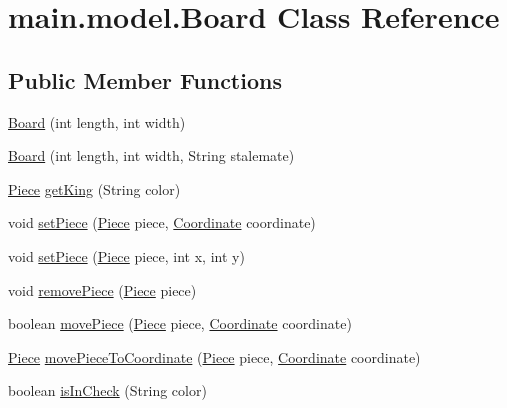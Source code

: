 \hypertarget{classmain_1_1model_1_1_board}{}\section{main.\+model.\+Board Class Reference}
\label{classmain_1_1model_1_1_board}
\subsection*{Public Member Functions}
\begin{DoxyCompactItemize}
\item 
\hyperlink{classmain_1_1model_1_1_board_aa960cea7bc44db0fdb54d18767579c52}{Board} (int length, int width)
\item 
\hyperlink{classmain_1_1model_1_1_board_a96612d9907fdc7144072b39701f3c98f}{Board} (int length, int width, String stalemate)
\item 
\hyperlink{classmain_1_1pieces_1_1_piece}{Piece} \hyperlink{classmain_1_1model_1_1_board_a58b12960567f10637634a020d9bc7ed6}{get\+King} (String color)
\item 
void \hyperlink{classmain_1_1model_1_1_board_ac89ac2b16c2e7ed3e0ff9160b471d99c}{set\+Piece} (\hyperlink{classmain_1_1pieces_1_1_piece}{Piece} piece, \hyperlink{classmain_1_1model_1_1_coordinate}{Coordinate} coordinate)
\item 
void \hyperlink{classmain_1_1model_1_1_board_a410cd03e774ce09fce169f8b047e413a}{set\+Piece} (\hyperlink{classmain_1_1pieces_1_1_piece}{Piece} piece, int x, int y)
\item 
void \hyperlink{classmain_1_1model_1_1_board_a267a2fd3d08cb25c4d35ceb9c61e5402}{remove\+Piece} (\hyperlink{classmain_1_1pieces_1_1_piece}{Piece} piece)
\item 
boolean \hyperlink{classmain_1_1model_1_1_board_a8924f9087f10a4554958ac48480e9b0b}{move\+Piece} (\hyperlink{classmain_1_1pieces_1_1_piece}{Piece} piece, \hyperlink{classmain_1_1model_1_1_coordinate}{Coordinate} coordinate)
\item 
\hyperlink{classmain_1_1pieces_1_1_piece}{Piece} \hyperlink{classmain_1_1model_1_1_board_abf3eb07b33b96a983bd98c26e7390ed4}{move\+Piece\+To\+Coordinate} (\hyperlink{classmain_1_1pieces_1_1_piece}{Piece} piece, \hyperlink{classmain_1_1model_1_1_coordinate}{Coordinate} coordinate)
\item 
boolean \hyperlink{classmain_1_1model_1_1_board_ac9396eab4affaccf9b66331a98f6e0d1}{is\+In\+Check} (String color)
\item 

\end{DoxyCompactItemize}
